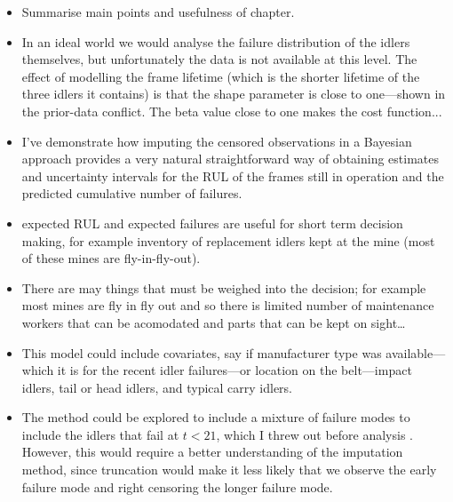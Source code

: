 \begin{itemize}
  \item Summarise main points and usefulness of chapter.
  \item In an ideal world we would analyse the failure distribution of the idlers themselves, but unfortunately the data is not available at this level. The effect of modelling the frame lifetime (which is the shorter lifetime of the three idlers it contains) is that the shape parameter is close to one---shown in the prior-data conflict. The beta value close to one makes the cost function...
  \item I've demonstrate how imputing the censored observations in a Bayesian approach provides a very natural straightforward way of obtaining estimates and uncertainty intervals for the RUL of the frames still in operation and the predicted cumulative number of failures.
  \item expected RUL and expected failures are useful for short term decision making, for example inventory of replacement idlers kept at the mine (most of these mines are fly-in-fly-out).
  \item There are may things that must be weighed into the decision; for example most mines are fly in fly out and so there is limited number of maintenance workers that can be acomodated and parts that can be kept on sight\dots 
  \item This model could include covariates, say if manufacturer type was available---which it is for the recent idler failures---or location on the belt---impact idlers, tail or head idlers, and typical carry idlers.
  \item The method could be explored to include a mixture of failure modes to include the idlers that fail at $t < 21$, which I threw out before analysis \citep{mittman2013}. However, this would require a better understanding of the imputation method, since truncation would make it less likely that we observe the early failure mode and right censoring the longer failure mode.
\end{itemize}